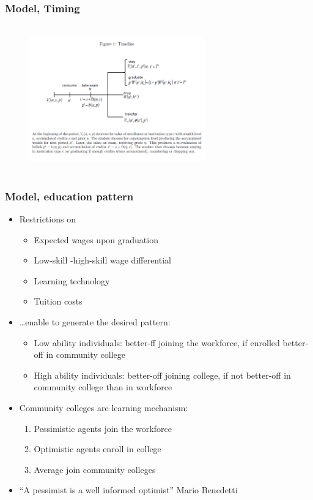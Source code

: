 \begin{frame}
	\frametitle{Model, Timing}
		\begin{figure}[H] 
			\caption*{}
			\centering
			\includegraphics[width=3in, height=2.5in]{Figures/T/figure1.png}
		\end{figure}
\end{frame}

\begin{frame}
	\frametitle{Model, education pattern}
		\begin{itemize}
			\item Restrictions on
				\begin{itemize}
					\item Expected wages upon graduation
					\item Low-skill -high-skill wage differential
					\item Learning technology
					\item Tuition costs
				\end{itemize}
			\item \ldots enable to generate the desired pattern:
				\begin{itemize}
					\item Low ability individuals: better-ff joining the workforce, if enrolled better-off in community college
					\item High ability individuals: better-off joining college, if not better-off in community college than in workforce
				\end{itemize}
			\item Community colleges are learning mechanism:
				\begin{enumerate}
					\item Pessimistic agents join the workforce
					\item Optimistic agents enroll in college
					\item Average join community colleges 
				\end{enumerate}
			\item ``A pessimist is a well informed optimist'' Mario Benedetti  			
		\end{itemize}
\end{frame}

